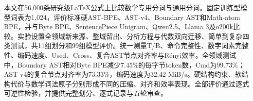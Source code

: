 本文在56,000条研究级LaTeX公式上比较数学专用分词与通用分词。固定训练型模型词表为1,024，评价标准硬AST-BPE、AST-v4、Boundary AST和Math-atom BPE，并与Byte BPE、SentencePiece Unigram、Qwen2.5、Llama 3及o200k比较。实验设置全领域新来源、整域留出、分析方程与代数双向迁移、简单到复杂四类测试，共11组划分和99组模型评价。统一测量T/B、命令完整性、数字词素完整性、编码速度、Used、Cross、复合AST节点对齐率与Rényi效率。全领域测试中，Boundary AST相对Byte BPE减少7.45\%的每字节token数，Cmd为99.73\%；AST-v4的复合节点对齐率为73.33\%，编码速度为32.42 MiB/s。硬结构约束、软结构代价与数学词法原子分别形成不同的压缩、对齐和效率表现。全部评价通过逐式可逆性检验，并提供完整划分、逐式记录与五轮审查。
